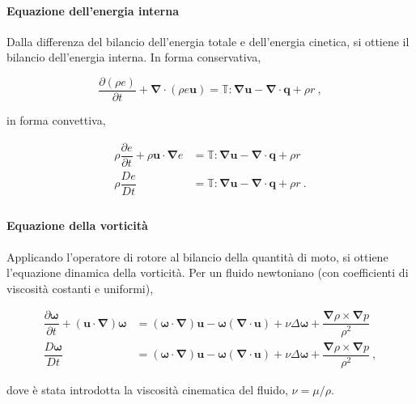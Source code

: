 \paragraph{Equazione dell'energia interna} Dalla differenza del bilancio dell'energia totale e dell'energia cinetica, si ottiene il bilancio dell'energia interna.
In forma conservativa,
\begin{fBox}
\begin{equation}
 \dfrac{\partial (\rho e)}{\partial t} + \bm{\nabla} \cdot (\rho e \bm{u}) = \mathbb{T}:\bm{\nabla}\bm{u} - \bm{\nabla} \cdot \bm{q} + \rho r \ ,
\end{equation}
\end{fBox}
in forma convettiva,
\begin{fBox}
 \begin{equation}
  \begin{aligned}
   \rho \dfrac{\partial e}{\partial t} +  \rho \bm{u}  \cdot \bm{\nabla}e & =  \mathbb{T}:\bm{\nabla}\bm{u} - \bm{\nabla} \cdot \bm{q} + \rho r \\
   \rho \dfrac{D e}{D t} & =  \mathbb{T}:\bm{\nabla}\bm{u} - \bm{\nabla} \cdot \bm{q} + \rho r \ . \\ 
  \end{aligned}
 \end{equation}
\end{fBox}


\paragraph{Equazione della vorticità} Applicando l'operatore di rotore al bilancio della quantità di moto, si ottiene l'equazione dinamica della vorticità. Per un fluido newtoniano (con coefficienti di viscosità costanti e uniformi),
\begin{fBox}
\begin{equation}
\begin{aligned}
 \dfrac{\partial \bm{\omega}}{\partial t} + (\bm{u} \cdot \bm{\nabla} ) \bm{\omega} & =
  (\bm{\omega} \cdot \bm{\nabla}) \bm{u} - \bm{\omega} (\bm{\nabla} \cdot \bm{u}) +
  \nu \Delta \bm{\omega} + \dfrac{\bm{\nabla} \rho \times \bm{\nabla} p}{\rho^2} \\
   \dfrac{D \bm{\omega}}{D t}  & =
  (\bm{\omega} \cdot \bm{\nabla}) \bm{u} - \bm{\omega} (\bm{\nabla} \cdot \bm{u}) +
  \nu \Delta \bm{\omega} + \dfrac{\bm{\nabla} \rho \times \bm{\nabla} p}{\rho^2} \ ,
 \end{aligned}
\end{equation}
\end{fBox}
dove è stata introdotta la viscosità cinematica del fluido, $\nu = \mu / \rho$.



